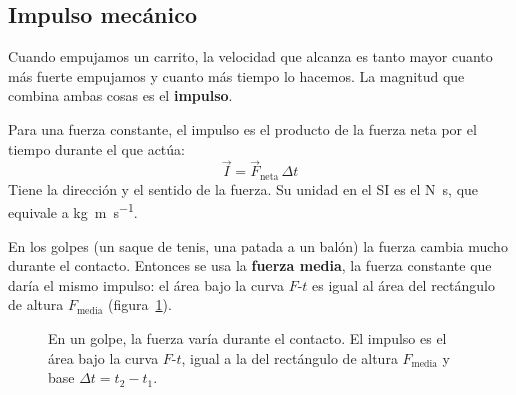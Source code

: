 \subsection{Impulso mecánico}

Cuando empujamos un carrito, la velocidad que alcanza es tanto mayor cuanto más fuerte empujamos y cuanto más tiempo lo hacemos. La
magnitud que combina ambas cosas es el \textbf{impulso}.

\begin{definition}
    Para una fuerza constante, el impulso es el producto de la fuerza neta por el tiempo durante el que actúa:
    \[ \vec{I} = \vec{F}_{\text{neta}}\,\Delta t \]
    Tiene la dirección y el sentido de la fuerza. Su unidad en el SI es el \unit{\newton\s}, que equivale a \unit{\kg\m\per\s}.
\end{definition}

En los golpes (un saque de tenis, una patada a un balón) la fuerza cambia mucho durante el contacto. Entonces se usa la \textbf{fuerza
media}, la fuerza constante que daría el mismo impulso: el área bajo la curva \(F\)-\(t\) es igual al área del rectángulo de altura
\(F_{\text{media}}\) (figura~\ref{fig:ud10-impulso}).

\begin{figure}[H]
    \centering
    \caption{En un golpe, la fuerza varía durante el contacto. El impulso es el área bajo la curva \(F\)-\(t\), igual a la del
    rectángulo de altura \(F_{\text{media}}\) y base \(\Delta t = t_2 - t_1\).}
    \label{fig:ud10-impulso}
\end{figure}

